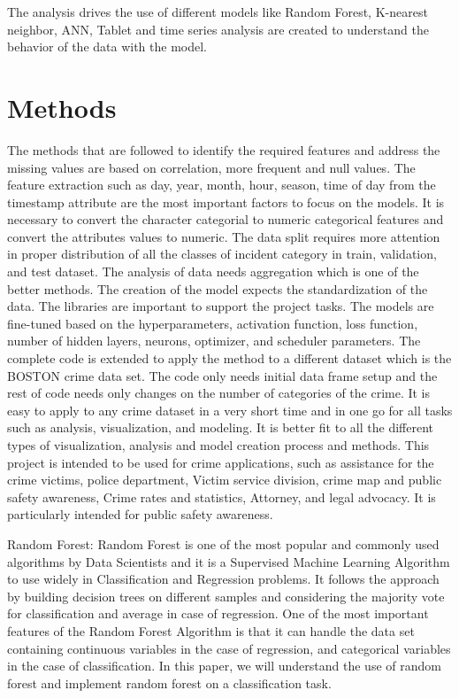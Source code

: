 \documentclass[conference,final,]{IEEEtran}
\begin{document}
The analysis drives the use of different models like Random Forest,
K-nearest neighbor, ANN, Tablet and time series analysis are created to
understand the behavior of the data with the model.

\section{Methods}\label{methods}

The methods that are followed to identify the required features and
address the missing values are based on correlation, more frequent and
null values. The feature extraction such as day, year, month, hour,
season, time of day from the timestamp attribute are the most important
factors to focus on the models. It is necessary to convert the character
categorial to numeric categorical features and convert the attributes
values to numeric. The data split requires more attention in proper
distribution of all the classes of incident category in train,
validation, and test dataset. The analysis of data needs aggregation
which is one of the better methods. The creation of the model expects
the standardization of the data. The libraries are important to support
the project tasks. The models are fine-tuned based on the
hyperparameters, activation function, loss function, number of hidden
layers, neurons, optimizer, and scheduler parameters. The complete code
is extended to apply the method to a different dataset which is the
BOSTON crime data set. The code only needs initial data frame setup and
the rest of code needs only changes on the number of categories of the
crime. It is easy to apply to any crime dataset in a very short time and
in one go for all tasks such as analysis, visualization, and modeling.
It is better fit to all the different types of visualization, analysis
and model creation process and methods. This project is intended to be
used for crime applications, such as assistance for the crime victims,
police department, Victim service division, crime map and public safety
awareness, Crime rates and statistics, Attorney, and legal advocacy. It
is particularly intended for public safety awareness.

Random Forest: Random Forest is one of the most popular and commonly
used algorithms by Data Scientists and it is a Supervised Machine
Learning Algorithm to use widely in Classification and Regression
problems. It follows the approach by building decision trees on
different samples and considering the majority vote for classification
and average in case of regression. One of the most important features of
the Random Forest Algorithm is that it can handle the data set
containing continuous variables in the case of regression, and
categorical variables in the case of classification. In this paper, we
will understand the use of random forest and implement random forest on
a classification task.
\end{document}
